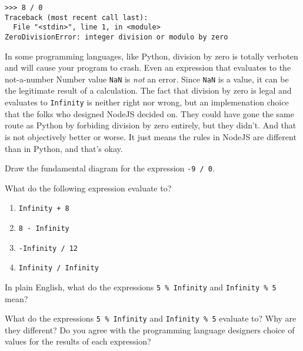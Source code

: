 \begin{lstlisting}[caption={Try this at home, kids! A stack trace caused by a \texttt{ZeroDivisionError} in a Python interpreter.}]
>>> 8 / 0
Traceback (most recent call last):
  File "<stdin>", line 1, in <module>
ZeroDivisionError: integer division or modulo by zero
\end{lstlisting}

In some programming languages, like Python, division by zero is totally verboten and will cause your program to crash. Even an expression that evaluates to the not-a-number \textsf{Number} value \texttt{NaN} is \emph{not} an error. Since \texttt{NaN} is a value, it can be the legitimate result of a calculation. The fact that division by zero is legal and evaluates to \texttt{Infinity} is neither right nor wrong, but an implemenation choice that the folks who designed NodeJS decided on. They could have gone the same route as Python by forbiding division by zero entirely, but they didn't. And that is not objectively better or worse. It just means the rules in NodeJS are different than in Python, and that's okay.

\begin{question}
  Draw the fundamental diagram for the expression \texttt{-9 / 0}.
\end{question}

\begin{question}
  What do the following expression evaluate to?
  \begin{enumerate}
    \item \texttt{Infinity + 8}
    \item \texttt{8 - Infinity}
    \item \texttt{-Infinity / 12}
    \item \texttt{Infinity / Infinity}
  \end{enumerate}
\end{question}

\begin{question}
  In plain English, what do the expressions \texttt{5 \% Infinity} and \texttt{Infinity \% 5} mean?
\end{question}

\begin{question}
  What do the expressions \texttt{5 \% Infinity} and \texttt{Infinity \% 5} evaluate to? Why are they different? Do you agree with the programming language designers choice of values for the results of each expression?
\end{question}

